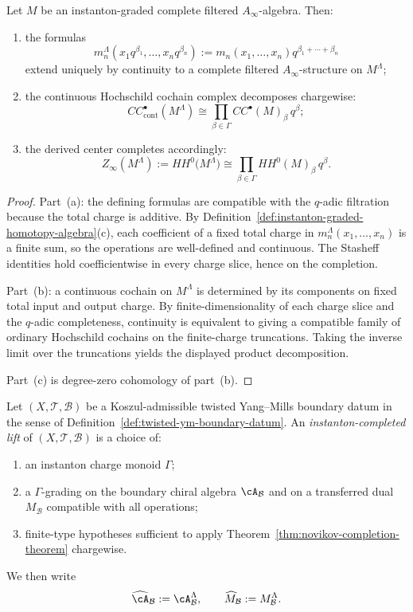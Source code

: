 \begin{theorem}
\label{thm:novikov-completion-theorem}
Let $M$ be an instanton-graded complete filtered $A_{\infty}$-algebra.
Then:
\begin{enumerate}[label=(\alph*)]
\item the formulas
\[
m_n^{\Lambda}(x_1q^{\beta_1},\dots,x_nq^{\beta_n})
:=m_n(x_1,\dots,x_n)q^{\beta_1+\cdots+\beta_n}
\]
extend uniquely by continuity to a complete filtered $A_{\infty}$-structure on $M^{\Lambda}$;
\item the continuous Hochschild cochain complex decomposes chargewise:
\[
CC^{\bullet}_{\mathrm{cont}}(M^{\Lambda})
\cong
\prod_{\beta\in\Gamma} CC^{\bullet}(M)_{\beta}\, q^{\beta};
\]
\item the derived center completes accordingly:
\[
Z_{\infty}(M^{\Lambda})
:=HH^0\bigl(M^{\Lambda}\bigr)
\cong
\prod_{\beta\in\Gamma} HH^0(M)_{\beta}\, q^{\beta}.
\]
\end{enumerate}
\end{theorem}

\begin{proof}
Part~(a): the defining formulas are compatible with the $q$-adic filtration because the total charge is
additive. By Definition~\ref{def:instanton-graded-homotopy-algebra}(c), each coefficient of a fixed total
charge in $m_n^{\Lambda}(x_1,\dots,x_n)$ is a finite sum, so the operations are well-defined and continuous.
The Stasheff identities hold coefficientwise in every charge slice, hence on the completion.

Part~(b): a continuous cochain on $M^{\Lambda}$ is determined by its components on fixed total input
and output charge. By finite-dimensionality of each charge slice and the $q$-adic completeness, continuity
is equivalent to giving a compatible family of ordinary Hochschild cochains on the finite-charge truncations.
Taking the inverse limit over the truncations yields the displayed product decomposition.

Part~(c) is degree-zero cohomology of part~(b).
\end{proof}

\begin{definition}
\label{def:instanton-completed-boundary-datum}
Let $(X,\mathcal T,\mathcal B)$ be a Koszul-admissible twisted Yang--Mills boundary datum in the sense of
Definition~\ref{def:twisted-ym-boundary-datum}. An \emph{instanton-completed lift} of $(X,\mathcal T,\mathcal B)$
is a choice of:
\begin{enumerate}[label=(\roman*)]
\item an instanton charge monoid $\Gamma$;
\item a $\Gamma$-grading on the boundary chiral algebra $\cA_{\mathcal B}$ and on a transferred dual
$M_{\mathcal B}$ compatible with all operations;
\item finite-type hypotheses sufficient to apply Theorem~\ref{thm:novikov-completion-theorem}
chargewise.
\end{enumerate}
We then write
\[
\widehat{\cA}_{\mathcal B}:=\cA_{\mathcal B}^{\Lambda},
\qquad
\widehat M_{\mathcal B}:=M_{\mathcal B}^{\Lambda}.
\]
\end{definition}

